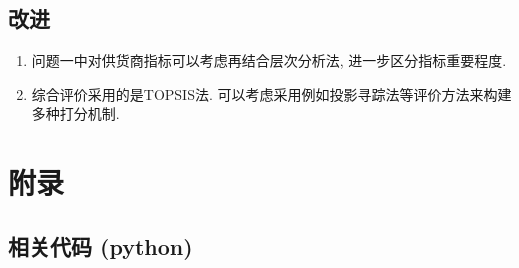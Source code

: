 \documentclass[11pt, fontset = windows]{article}
\begin{document}
\subsection[]{改进}

\begin{enumerate}

    \item 问题一中对供货商指标可以考虑再结合层次分析法, 进一步区分指标重要程度.

    \item 综合评价采用的是TOPSIS法. 可以考虑采用例如投影寻踪法等评价方法来构建多种打分机制.

\end{enumerate}





\newpage

\section*{附录}

\subsection*{相关代码 (python) }


\end{document}
